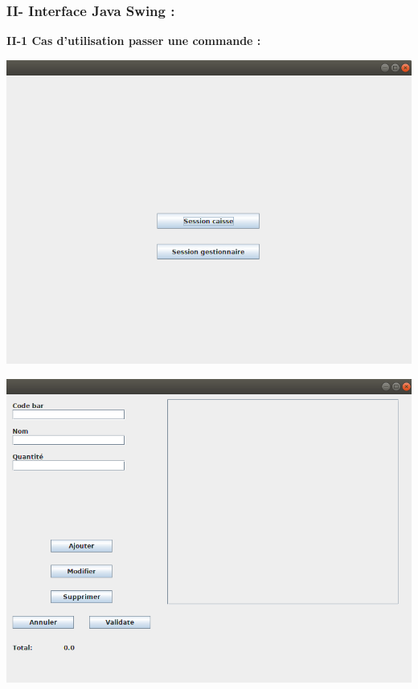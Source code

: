\documentclass[french,10pt,a4paper]{report}
\begin{document}
\subsubsection{II- Interface Java Swing :}
\textbf{II-1 Cas d'utilisation passer une commande :}
\begin{center}
	\includegraphics[scale=0.4]{captures/1_swing.png}
\end{center}
\begin{center}
	\includegraphics[scale=0.4]{captures/2_swing.png}
\end{center}
\end{document}
